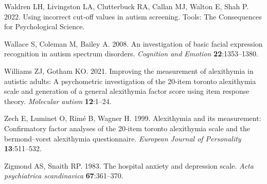 \documentclass[
]{article}
\newlength{\cslhangindent}
\newlength{\cslentryspacingunit} %
\newenvironment{CSLReferences}[2] %
 {%
  \setlength{\parindent}{0pt}
  \ifodd #1
  \let\oldpar\par
  \def\par{\hangindent=\cslhangindent\oldpar}
  \fi
  \setlength{\parskip}{#2\cslentryspacingunit}
 }%
 {}
\begin{document}
\begin{CSLReferences}{1}{0}
\leavevmode{}%
Waldren LH, Livingston LA, Clutterbuck RA, Callan MJ, Walton E, Shah P. 2022. Using incorrect cut-off values in autism screening. Tools: The Consequences for Psychological Science.

\leavevmode{}%
Wallace S, Coleman M, Bailey A. 2008. An investigation of basic facial expression recognition in autism spectrum disorders. \emph{Cognition and Emotion} \textbf{22}:1353--1380.

\leavevmode{}%
Williams ZJ, Gotham KO. 2021. Improving the measurement of alexithymia in autistic adults: A psychometric investigation of the 20-item toronto alexithymia scale and generation of a general alexithymia factor score using item response theory. \emph{Molecular autism} \textbf{12}:1--24.

\leavevmode{}%
Zech E, Luminet O, Rimé B, Wagner H. 1999. Alexithymia and its measurement: Confirmatory factor analyses of the 20‐item toronto alexithymia scale and the bermond--vorst alexithymia questionnaire. \emph{European Journal of Personality} \textbf{13}:511--532.

\leavevmode{}%
Zigmond AS, Snaith RP. 1983. The hospital anxiety and depression scale. \emph{Acta psychiatrica scandinavica} \textbf{67}:361--370.

\end{CSLReferences}
\end{document}

